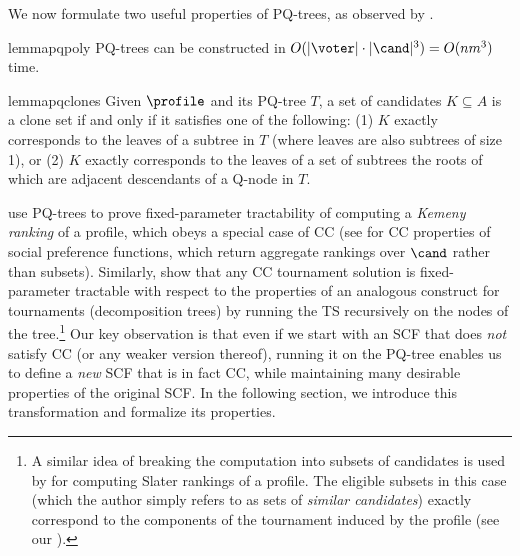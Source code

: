 We now formulate two useful properties of PQ-trees, as observed by 
\citet{Cornaz13:Kemeny}.

\begin{restatable}{lemma}{pqpoly} \label{lemma:pq-poly}
    PQ-trees can be constructed in $O(|\voter|\cdot|\cand|^3)=O(nm^3)$ time.
\end{restatable}

\begin{restatable}{lemma}{pqclones} \label{lemma:pq_clones}
    Given $\profile$ and its PQ-tree $T$, a set of candidates $K \subseteq A$ is a clone set if and only if it satisfies one of the following: (1) $K$ exactly corresponds to the leaves of a subtree in $T$ (where leaves are also subtrees of size 1), or (2) $K$ exactly corresponds to the leaves of a set of subtrees the roots of which are adjacent descendants of a Q-node in $T$. 
\end{restatable}

\citet{Cornaz13:Kemeny} use PQ-trees to prove fixed-parameter tractability of computing a \emph{Kemeny ranking} of a profile, which obeys a special case of CC (see  for CC properties of social preference functions, which return aggregate rankings over $\cand$ rather than subsets). Similarly, \citet{Brandt11:Fixed} show that any CC tournament solution is fixed-parameter tractable with respect to the properties of an analogous construct for tournaments (decomposition trees) by running the TS recursively on the nodes of the tree.\footnote{A similar idea of breaking the computation into subsets of candidates is used by \citet{Conitzer06:Computing} for computing Slater rankings of a profile. The eligible subsets in this case (which the author simply refers to as sets of \emph{similar candidates}) exactly correspond to the components of the tournament induced by the profile (see our ).} Our key observation is that even if we start with an SCF that does \emph{not} satisfy CC (or any weaker version thereof), running it on the PQ-tree enables us to define a \emph{new} SCF that is in fact CC, while maintaining many desirable properties of the original SCF. In the following section, we introduce this transformation and formalize its properties.

